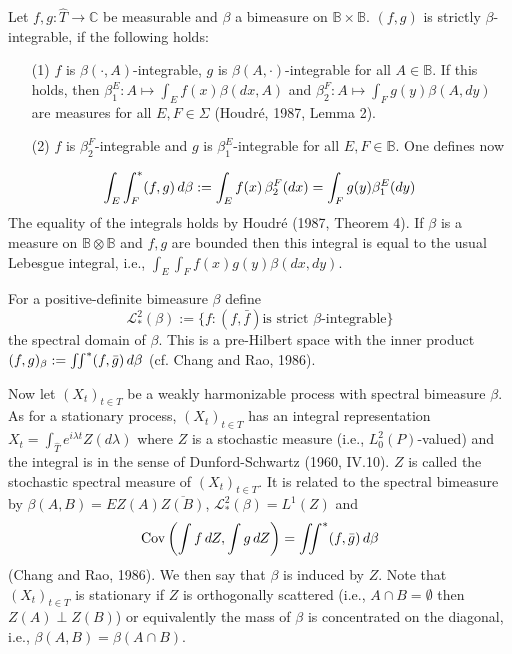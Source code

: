 \documentclass{article}
\newcommand{\assign}{:=}
\newcommand{\cdummy}{\cdot}
\begin{document}
Let $f, g : \hat{T} \to \mathbb{C}$ be measurable and $\beta$ a bimeasure on
$\mathbb{B} \times \mathbb{B}$. $(f, g)$ is strictly $\beta$-integrable, if
the following holds:
\begin{itemize}
  \item[(1)] $f$ is $\beta (\cdummy, A)$-integrable, $g$ is $\beta (A,
  \cdot)$-integrable for all $A \in \mathbb{B}$. If this holds, then
  $\beta_1^E : A \mapsto \int_E f (x) \beta (dx, A)$ and $\beta_2^F : A
  \mapsto \int_F g (y) \beta (A, dy)$ are measures for all $E, F \in \Sigma$
  (Houdr{\'e}, 1987, Lemma 2).
  
  \item[(2)] $f$ is $\beta_2^F$-integrable and $g$ is $\beta_1^E$-integrable
  for all $E, F \in \mathbb{B}$. One defines now
\end{itemize}
\begin{equation}
  \int_E \int_F^{\ast} (f, g)  \hspace{0.17em} d \beta \assign \int_E f (x) 
  \hspace{0.17em} \beta_2^F  (dx) = \int_F g (y) \beta_1^E  (dy)
\end{equation}
The equality of the integrals holds by Houdr{\'e} (1987, Theorem 4). If
$\beta$ is a measure on $\mathbb{B} \otimes \mathbb{B}$ and $f, g$ are bounded
then this integral is equal to the usual Lebesgue integral, i.e., $\int_E
\int_F f (x) g (y) \beta (dx, dy)$.

For a positive-definite bimeasure $\beta$ define
\begin{equation}
  \mathscr{L}_{\ast}^2 (\beta) \assign \{f : (f, \bar{f}) \text{is strict }
  \beta \text{-integrable} \}
\end{equation}
the spectral domain of $\beta$. This is a pre-Hilbert space with the inner
product $(f, g)_{\beta} \assign \iint^{\ast} (f, \bar{g})  \hspace{0.17em} d
\beta$ (cf. Chang and Rao, 1986).

Now let $(X_t)_{t \in T}$ be a weakly harmonizable process with spectral
bimeasure $\beta$. As for a stationary process, $(X_t)_{t \in T}$ has an
integral representation $X_t = \int_{\hat{T}} e^{i \lambda t} Z (d \lambda)$
where $Z$ is a stochastic measure (i.e., $L_0^2 (P)$-valued) and the integral
is in the sense of Dunford-Schwartz (1960, IV.10). $Z$ is called the
stochastic spectral measure of $(X_t)_{t \in T}$. It is related to the
spectral bimeasure by $\beta (A, B) = EZ (A) \overline{Z (B)}$,
$\mathscr{L}_{\ast}^2 (\beta) = L^1 (Z)$ and
\begin{equation}
  \mathrm{Cov} \left( \int f \hspace{0.17em} dZ, \int g \hspace{0.17em} dZ
  \right) = \iint^{\ast} (f, \bar{g})  \hspace{0.17em} d \beta
\end{equation}
(Chang and Rao, 1986). We then say that $\beta$ is induced by $Z$. Note that
$(X_t)_{t \in T}$ is stationary if $Z$ is orthogonally scattered (i.e., $A
\cap B = \emptyset$ then $Z (A) \perp Z (B)$) or equivalently the mass of
$\beta$ is concentrated on the diagonal, i.e., $\beta (A, B) = \beta (A \cap
B)$.
\end{document}
